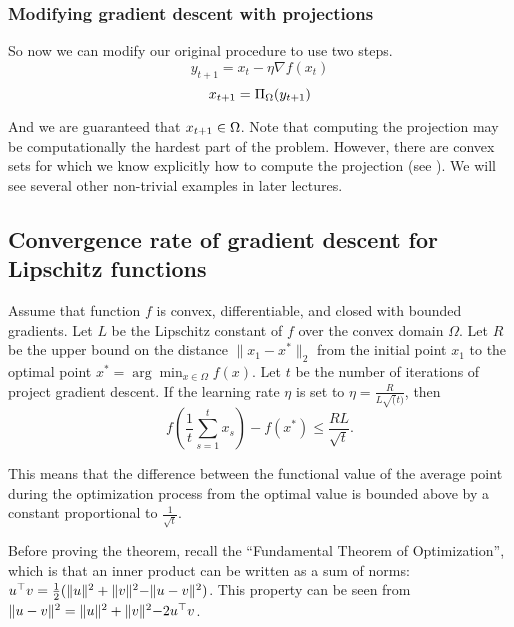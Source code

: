 \subsubsection{Modifying gradient descent with projections}

So now we can modify our original procedure to use two steps.
\[
y_{t+1} = x_t - \eta \nabla f(x_t)
\]
\[
x_{t+1} = \Pi_{\Omega}(y_{t+1})
\]

And we are guaranteed that $x_{t+1}\in\Omega$. Note that computing the
projection may be computationally the hardest part of the problem.
However, there are convex sets for which we know explicitly how to
compute the projection (see ). We will see several
other non-trivial examples in later lectures.

\subsection{Convergence rate of gradient descent for Lipschitz functions}

\begin{theorem}

Assume that function $f$ is convex, differentiable, and closed with bounded
gradients. Let $L$ be the Lipschitz constant of $f$ over the convex domain
$\Omega$. Let $R$ be the upper bound on the distance $\lVert x_1 - x^* \rVert_2$
from the initial point $x_1$ to the optimal point $x^* = \arg\min_{x \in \Omega} f(x)$.
Let $t$ be the number of iterations of project gradient descent.
If the learning rate $\eta$ is set to $\eta=\frac{R}{L\sqrt(t)}$,
then $$f\left(\frac{1}{t}\sum_{s=1}^t x_s\right) - f\left(x^*\right) \leq
\frac{RL}{\sqrt{t}}.$$
\end{theorem}

This means that the difference between the functional value of the average
point during the optimization process from the optimal value is bounded above
by a constant proportional to $\frac{1}{\sqrt{t}}$.

Before proving the theorem, recall the ``Fundamental Theorem of Optimization'',
which is that an inner product can be written as a sum of norms: $u^\top v =
\frac{1}{2}(\lVert u \rVert^2 + \lVert v \lVert^2 - \lVert u - v \rVert^2)$.
This property can be seen from $\lVert u - v \rVert^2 = \lVert u \rVert^2 + \lVert v \lVert^2 - 2 u^\top v$.

